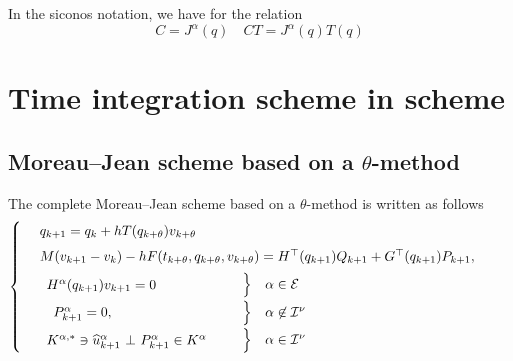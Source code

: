In the siconos notation, we have for the relation
\begin{equation}
  \label{eq:100}
   C =   J^\alpha(q) \quad CT = J^\alpha(q)T(q)
\end{equation}







\section{Time integration scheme in scheme}


\subsection{Moreau--Jean scheme based on a  $\theta$-method}
The complete Moreau--Jean scheme based on a  $\theta$-method is written as follows
 \begin{equation}
    \label{eq:Moreau--Jean-theta}
    \begin{cases}
      ~~\begin{array}{l}
        q_{k+1} = q_{k} + h T(q_{k+\theta}) v_{k+\theta} \quad \\[1ex]
        M(v_{k+1}-v_k) - h  F(t_{k+\theta}, q_{k+\theta},v_{k+\theta}) =  H^\top(q_{k+1}) Q_{k+1} + G^\top(q_{k+1}) P_{k+1},\quad\,\\[1ex]
      \end{array}\\
      ~~\begin{array}{lcl}
        \begin{array}{l}
          H^\alpha(q_{k+1}) v_{k+1}  =  0\\
        \end{array} & \left. \begin{array}{l}
          \vphantom{H^\alpha(q_{k+1}) v_{k+1}  =  0}\\[1ex]
        \end{array}\right\}    &\alpha \in \mathcal E  \\[1ex]
      ~~~P_{k+1}^\alpha= 0, &
      \left. \begin{array}{l}
          \vphantom{P_{k+1}^\alpha= 0,  \delta^\alpha_{k+1}=0}\\[1ex]
        \end{array}\right\}   & \alpha \not\in \mathcal I^\nu \\[1ex]
      \begin{array}{l}
          {K}^{\alpha,*} \ni \widehat u_{k+1}^\alpha~ \bot~ P_{k+1}^\alpha \in {K}^\alpha \\
      \end{array} &
      \left.\begin{array}{l}
          \vphantom{{K}^{\alpha,*} \ni \widehat u_{k+1}^\alpha~ \bot~ P_{k+1}^\alpha \in {K}^\alpha} \\
        \end{array}\right\}
      &\alpha \in \mathcal I^\nu\\
  \end{array}
\end{cases}
\end{equation}
